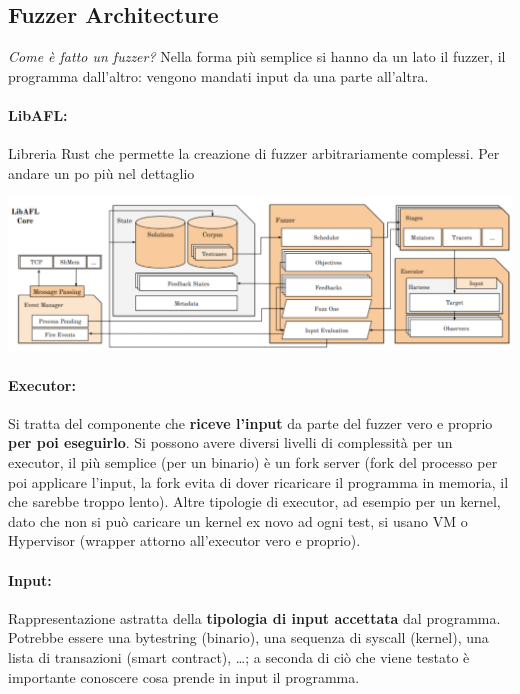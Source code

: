 \newpage

\subsection{Fuzzer Architecture}

\textit{Come è fatto un fuzzer?} Nella forma più semplice si hanno da un lato il fuzzer, il programma dall'altro: vengono mandati input da una parte all'altra. \\

\paragraph{LibAFL:} Libreria Rust che permette la creazione di fuzzer arbitrariamente complessi. Per andare un po più nel dettaglio
\begin{center}
	\includegraphics[width=0.95\linewidth]{img/fuzzing/fuzzercore}
\end{center}

\paragraph{Executor:} Si tratta del componente che \textbf{riceve l'input} da parte del fuzzer vero e proprio \textbf{per poi eseguirlo}. Si possono avere diversi livelli di complessità per un executor, il più semplice (per un binario) è un fork server (fork del processo per poi applicare l'input, la fork evita di dover ricaricare il programma in memoria, il che sarebbe troppo lento). Altre tipologie di executor, ad esempio per un kernel, dato che non si può caricare un kernel ex novo ad ogni test, si usano VM o Hypervisor (wrapper attorno all'executor vero e proprio).\\

\paragraph{Input:} Rappresentazione astratta della \textbf{tipologia di input accettata} dal programma. Potrebbe essere una bytestring (binario), una sequenza di syscall (kernel), una lista di transazioni (smart contract), \dots; a seconda di ciò che viene testato è importante conoscere cosa prende in input il programma.\\

